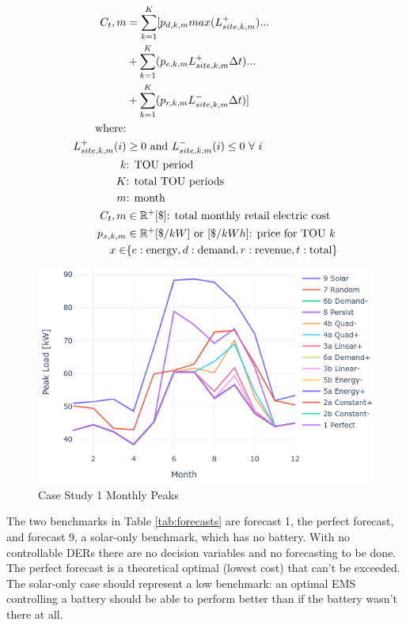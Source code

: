 \documentclass[conference]{IEEEtran}
\begin{document}
\begin{align}
    C_t,m           & = \sum_{k=1}^K [p_{d,k,m}  max(L^+_{site,k,m}) ...  \notag \\
                & +  \sum_{k=1}^K (p_{e,k,m} L^+_{site,k,m}\Delta t) ... \notag \\
                & +  \sum_{k=1}^K (p_{r,k,m} L^-_{site,k,m}\Delta t) ] \label{eq:cost} \\
                \text{where:}& \notag \\
                L_{site,k,m}^+(i) & \ge 0 \text{ and } L_{site,k,m}^-(i) \le 0\ \forall\ i \notag \\
                k & \text{: TOU period} \notag \\
                K & \text{: total TOU periods} \notag \\
                m & \text{: month} \notag \\
    C_t,m         & \in \mathbb{R}^+ [\$] \text{: total monthly retail electric cost} \notag \\
    p_{x,k,m}     & \in \mathbb{R}^+ [\$/kW] \text{ or } [\$/kWh] \text{: price for TOU } k \notag \\
    x \in & \{e:\text{energy},d:\text{demand},r:\text{revenue},t:\text{total} \}  \notag 
\end{align}


\begin{figure}
    \centering
    \includegraphics[width=1\linewidth]{images/monthly_peaks_lines.png}
    \caption{Case Study 1 Monthly Peaks}
    \label{fig:cs1-peaks}
\end{figure}

The two benchmarks in Table \ref{tab:forecasts} are forecast 1, the perfect forecast, and forecast 9, a solar-only benchmark, which has no battery. With no controllable DERs there are no decision variables and no forecasting to be done. The perfect forecast is a theoretical optimal (lowest cost) that can't be exceeded. The solar-only case should represent a low benchmark: an optimal EMS controlling a battery should be able to perform better than if the battery wasn't there at all.  
\end{document}

